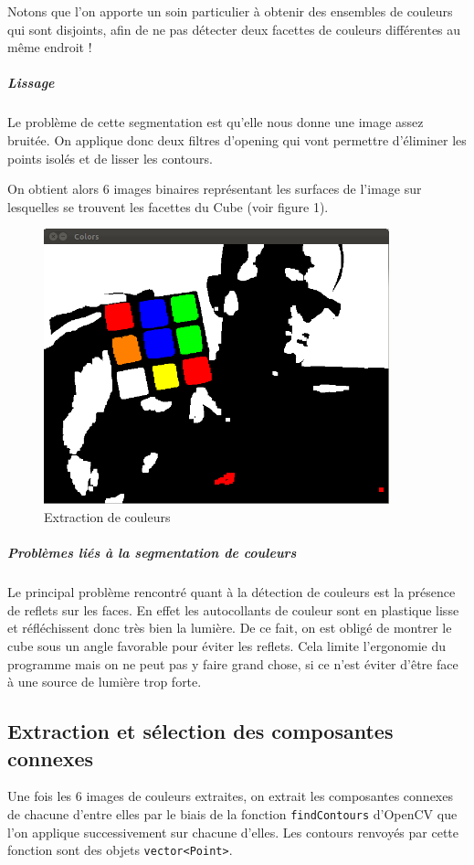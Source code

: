 \documentclass[a4paper,11pt]{article}
\begin{document}
Notons que l'on apporte un soin particulier à obtenir des ensembles de couleurs qui sont disjoints, afin de
ne pas détecter deux facettes de couleurs différentes au même endroit !

\subparagraph{Lissage}
Le problème de cette segmentation est qu'elle nous donne une image assez bruitée. On applique donc deux filtres
d'opening qui vont permettre d'éliminer les points isolés et de lisser les contours.

On obtient alors 6 images binaires représentant les surfaces de l'image sur lesquelles se trouvent
les facettes du Cube (voir figure 1).

\begin{figure}[h]
\begin{center}
 \includegraphics[width=10cm]{couleurs.png} 
\end{center}
 \caption{Extraction de couleurs}
 \label{Extraction de couleurs}
\end{figure}

\subparagraph{Problèmes liés à la segmentation de couleurs}
Le principal problème rencontré quant à la détection de couleurs est la présence de reflets sur les faces. En
effet les autocollants de couleur sont en plastique lisse et réfléchissent donc très bien la lumière. De ce fait, on
est obligé de montrer le cube sous un angle favorable pour éviter les reflets. Cela limite l'ergonomie du 
programme mais on ne peut pas y faire grand chose, si ce n'est éviter d'être face à une source de lumière trop
forte.

\subsection{Extraction et sélection des composantes connexes}
Une fois les 6 images de couleurs extraites, on extrait les composantes connexes de chacune d'entre elles par
le biais de la fonction \verb|findContours| d'OpenCV que l'on applique successivement sur chacune d'elles.
Les contours renvoyés par cette fonction sont des objets \verb|vector<Point>|.
\end{document}
